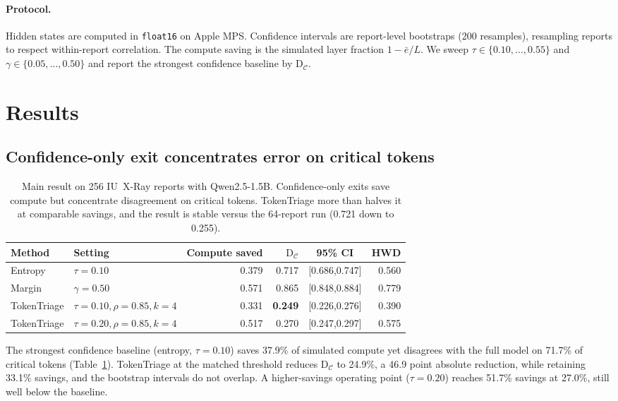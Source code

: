 \documentclass[11pt]{article}
\newcommand{\method}{\mbox{TokenTriage}}
\newcommand{\critset}{\mathcal{C}}
\begin{document}
\paragraph{Protocol.}
Hidden states are computed in \texttt{float16} on Apple MPS. Confidence intervals are report-level
bootstraps (200 resamples), resampling reports to respect within-report correlation. The compute saving
is the simulated layer fraction $1-\bar{e}/L$. We sweep $\tau\in\{0.10,\dots,0.55\}$ and
$\gamma\in\{0.05,\dots,0.50\}$ and report the strongest confidence baseline by $\mathrm{D}_\critset$.

\section{Results}
\label{sec:results}

\subsection{Confidence-only exit concentrates error on critical tokens}
\begin{table}[h]
\centering\small
\setlength{\tabcolsep}{6pt}\renewcommand{\arraystretch}{1.15}
\begin{tabular}{llrrcr}
\toprule
Method & Setting & Compute saved & $\mathrm{D}_\critset$ & 95\% CI & HWD \\
\midrule
Entropy & $\tau{=}0.10$ & 0.379 & 0.717 & [0.686,0.747] & 0.560 \\
Margin & $\gamma{=}0.50$ & 0.571 & 0.865 & [0.848,0.884] & 0.779 \\
\rowcolor{rowhi}
\method{} & $\tau{=}0.10,\rho{=}0.85,k{=}4$ & 0.331 & \textbf{0.249} & [0.226,0.276] & 0.390 \\
\method{} & $\tau{=}0.20,\rho{=}0.85,k{=}4$ & 0.517 & 0.270 & [0.247,0.297] & 0.575 \\
\bottomrule
\end{tabular}
\caption{Main result on 256 IU~X-Ray reports with Qwen2.5-1.5B. Confidence-only exits save compute but
concentrate disagreement on critical tokens. \method{} more than halves it at comparable savings, and
the result is stable versus the 64-report run (0.721 down to 0.255).}
\label{tab:main}
\end{table}

The strongest confidence baseline (entropy, $\tau{=}0.10$) saves 37.9\% of simulated compute yet
disagrees with the full model on 71.7\% of critical tokens (Table~\ref{tab:main}). \method{} at the
matched threshold reduces $\mathrm{D}_\critset$ to 24.9\%, a 46.9 point absolute reduction, while
retaining 33.1\% savings, and the bootstrap intervals do not overlap. A higher-savings operating point
($\tau{=}0.20$) reaches 51.7\% savings at 27.0\%, still well below the baseline.
\end{document}
